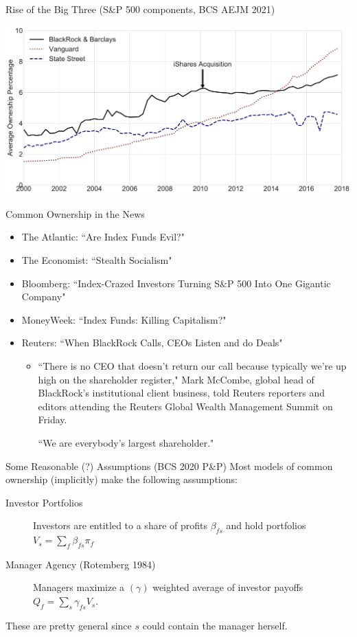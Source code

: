 \documentclass[handout, serif, aspectratio=169, 10pt]{beamer}
\begin{document}
\begin{frame}[plain]{Rise of the Big Three (S\&P 500 components, BCS AEJM 2021)}
\begin{center}
\includegraphics[height=0.9\textheight]{./figures/figure5_big3.pdf}
\end{center}
\end{frame}

\begin{frame}[plain]{Common Ownership in the News}
\begin{itemize}
\item The Atlantic: ``Are Index Funds Evil?"
\item The Economist: ``Stealth Socialism"
\item Bloomberg: ``Index-Crazed Investors Turning S\&P 500 Into One Gigantic Company"
\item MoneyWeek: ``Index Funds: Killing Capitalism?"
\item Reuters: ``When BlackRock Calls, CEOs Listen and do Deals"
\pause
\begin{itemize}
\item ``There is no CEO that doesn't return our call because typically we're up high on the shareholder register," Mark McCombe, global head of BlackRock's institutional client business, told Reuters reporters and editors attending the Reuters Global Wealth Management Summit on Friday.

``We are everybody's largest shareholder."
\end{itemize}
\end{itemize}
\end{frame}


\begin{frame}{Some Reasonable (?) Assumptions (BCS 2020 P\&P)}
Most models of common ownership (implicitly) make the following assumptions:
\begin{description}
\item[Investor Portfolios] Investors are entitled to a share of profits $\beta_{fs}$ and hold portfolios $V_s = \sum_{f} \beta_{fs} \pi_f$
\pause
\item[Manager Agency (Rotemberg 1984)] Managers maximize a $(\gamma)$ weighted average of investor payoffs $Q_f = \sum_{s} \gamma_{fs} V_s$.
\end{description}
These are pretty general since $s$ could contain the manager herself.\\
\end{frame}
\end{document}
